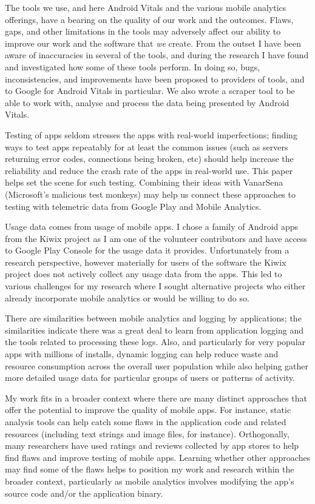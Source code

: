 The tools we use, and here Android Vitals and the various mobile analytics offerings, have a bearing on the quality of our work and the outcomes. Flaws, gaps, and other limitations in the tools may adversely affect our ability to improve our work and the software that \textit{we} create. From the outset I have been aware of inaccuracies in several of the tools, and during the research I have found and investigated how some of these tools perform. In doing so, bugs, inconsistencies, and improvements have been proposed to providers of tools, and to Google for Android Vitals in particular. We also wrote a scraper tool to be able to work with, analyse and process the data being presented by Android Vitals.

Testing of apps seldom stresses the apps with real-world imperfections; finding ways to test apps repeatably for at least the common issues (such as servers returning error codes, connections being broken, etc) should help increase the reliability and reduce the crash rate of the apps in real-world use. This paper helps set the scene for such testing. Combining their ideas with VanarSena (Microsoft's malicious test monkeys) may help us connect these approaches to testing with telemetric data from Google Play and Mobile Analytics.

Usage data comes from usage of mobile apps. I chose a family of Android apps from the Kiwix project as I am one of the volunteer contributors and have access to Google Play Console for the usage data it provides. Unfortunately from a research perspective, however materially for users of the software the Kiwix project does not actively collect any usage data from the apps. This led to various challenges for my research where I sought alternative projects who either already incorporate mobile analytics or would be willing to do so.

There are similarities between mobile analytics and logging by applications; the similarities indicate there was a great deal to learn from application logging and the tools related to processing these logs. Also, and particularly for very popular apps with millions of installs, dynamic logging can help reduce waste and resource consumption across the overall user population while also helping gather more detailed usage data for particular groups of users or patterns of activity.

My work fits in a broader context where there are many distinct approaches that offer the potential to improve the quality of mobile apps. For instance, static analysis tools can help catch some flaws in the application code and related resources (including text strings and image files, for instance). Orthogonally, many researchers have used ratings and reviews collected by app stores to help find flaws and improve testing of mobile apps.  Learning whether other approaches may find some of the flaws helps to position my work and research within the broader context, particularly as mobile analytics involves modifying the app's source code and/or the application binary.

